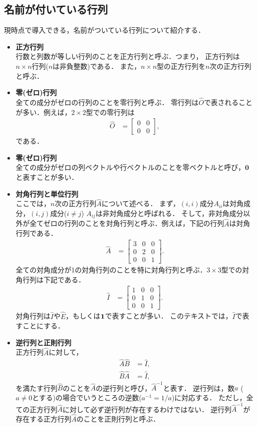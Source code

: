 \subsection{名前が付いている行列}
%
現時点で導入できる，名前がついている行列について紹介する．
%
\begin{itemize}
\item \textbf{正方行列}\\
行数と列数が等しい行列のことを正方行列と呼ぶ．つまり，
正方行列は$n\times n$行列($n$は非負整数)である．
また，$n\times n$型の正方行列を$n$次の正方行列と呼ぶ．
%
\item \textbf{零(ゼロ)行列}\\
全ての成分がゼロの行列のことを零行列と呼ぶ．
零行列は$\hat{O}$で表されることが多い．例えば，$2\times 2$型での零行列は
\begin{align}
\hat{O} & =\left[\begin{array}{cc}
0 & 0\\
0 & 0
\end{array}\right], 
\end{align}
である． 
%
\item \textbf{零(ゼロ)行列}\\
全ての成分がゼロの列ベクトルや行ベクトルのことを零ベクトルと呼び，$\bm{0}$と表すことが多い．
%
\item \textbf{対角行列と単位行列}\\
ここでは，$n$次の正方行列$\hat{A}$について述べる．
まず，$(i,i)$成分$A_{ii}$は対角成分，$(i,j)$成分($i\neq j$) $A_{ij}$は非対角成分と呼ばれる．
そして，非対角成分以外が全てゼロの行列のことを対角行列と呼ぶ．例えば，下記の行列$\hat{A}$は対角行列である．
\begin{align}
 \hat{A} & =\left[\begin{array}{ccc}
3 & 0 & 0\\
0 & 2 & 0\\
0 & 0 & 1
\end{array}\right].
\end{align}
全ての対角成分が1の対角行列のことを特に対角行列と呼ぶ．$3\times 3$型での対角行列は下記である．
\begin{align}
\hat{I} & =\left[\begin{array}{ccc}
1 & 0 & 0\\
0 & 1 & 0\\
0 & 0 & 1
\end{array}\right].
\end{align}
対角行列は$\hat{I}$や$\hat{E}$，もしくは${\bf 1}$で表すことが多い．
このテキストでは，$\hat{I}$で表すことにする．
%
\item \textbf{逆行列と正則行列}\\
%
正方行列$\hat{A}$に対して，
%
\begin{align}
\hat{A}\hat{B} & =\hat{I},\\
\hat{B}\hat{A} & =\hat{I},  
\end{align}
を満たす行列$\hat{B}$のことを$\hat{A}$の逆行列と呼び，$\hat{A}^{-1}$と表す．
逆行列は，数$a$ ($a\neq 0$とする)の場合でいうところの逆数($a^{-1}=1/a$)に対応する．
ただし，全ての正方行列$\hat{A}$に対して必ず逆行列が存在するわけではない．
逆行列$\hat{A}^{-1}$が存在する正方行列$\hat{A}$のことを正則行列と呼ぶ．
%
\end{itemize}
%
